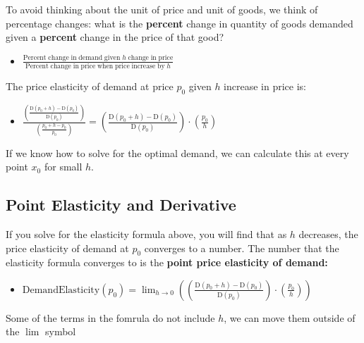 \documentclass[
]{book}
\providecommand{\tightlist}{%
  \setlength{\itemsep}{0pt}\setlength{\parskip}{0pt}}
\begin{document}
To avoid thinking about the unit of price and unit of goods, we think of
percentage changes: what is the \textbf{percent} change in quantity of goods
demanded given a \textbf{percent} change in the price of that good?

\begin{itemize}
\tightlist
\item
  \(\displaystyle \frac{\textrm{Percent}\;\textrm{change}\;\textrm{in}\;\textrm{demand}\;\textrm{given}\;h\;\textrm{change}\;\textrm{in}\;\textrm{price}}{\textrm{Percent}\;\textrm{change}\;\textrm{in}\;\textrm{price}\;\textrm{when}\;\textrm{price}\;\textrm{increase}\;\textrm{by}\;h}\)
\end{itemize}

The price elasticity of demand at price \(p_0\) given \(h\) increase in
price is:

\begin{itemize}
\tightlist
\item
  \(\displaystyle \frac{\left(\frac{\textrm{D}(p_0 +h)-\textrm{D}(p_0 )}{\textrm{D}(p_0 )}\right)}{\left(\frac{p_0 +h-p_0 }{p_0 }\right)}=\left(\frac{\textrm{D}(p_0 +h)-\textrm{D}(p_0 )}{\textrm{D}(p_0 )}\right)\cdot \left(\frac{p_0 }{h}\right)\)
\end{itemize}

If we know how to solve for the optimal demand, we can calculate this at
every point \(x_0\) for small \(h\).

\hypertarget{point-elasticity-and-derivative}{%
\subsection{Point Elasticity and Derivative}\label{point-elasticity-and-derivative}}

If you solve for the elasticity formula above, you will find that as \(h\)
decreases, the price elasticity of demand at \(p_0\) converges to a
number. The number that the elasticity formula converges to is the
\textbf{point price elasticity of demand:}

\begin{itemize}
\tightlist
\item
  \(\displaystyle \textrm{DemandElasticity}(p_0 )=\lim_{h\to 0} \left(\left(\frac{\textrm{D}(p_0 +h)-\textrm{D}(p_0 )}{\textrm{D}(p_0 )}\right)\cdot \left(\frac{p_0 }{h}\right)\right)\)
\end{itemize}

Some of the terms in the fomrula do not include \(h\), we can move them
outside of the \(\lim\) symbol
\end{document}
